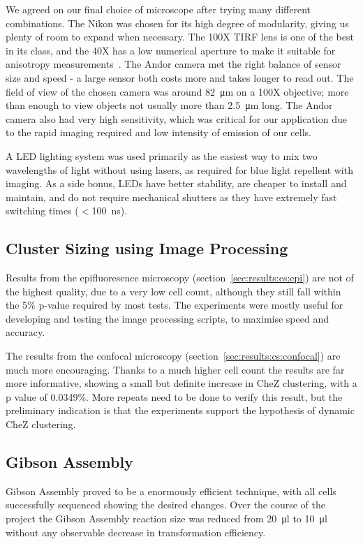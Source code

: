 \documentclass[../main.tex]{subfiles}
\begin{document}
We agreed on our final choice of microscope after trying many different combinations. The Nikon was chosen for its high degree of modularity, giving us plenty of room to expand when necessary. The 100X TIRF lens is one of the best in its class, and the 40X has a low numerical aperture to make it suitable for anisotropy measurements~\citep{lakowicz}. The Andor camera met the right balance of sensor size and speed - a large sensor both costs more and takes longer to read out. The field of view of the chosen camera was around \SI{82}{\micro\meter} on a 100X objective; more than enough to view objects not usually more than \SI{2.5}{\micro\meter} long. The Andor camera also had very high sensitivity, which was critical for our application due to the rapid imaging required and low intensity of emission of our cells.

A LED lighting system was used primarily as the easiest way to mix two wavelengths of light without using lasers, as required for blue light repellent with imaging. As a side bonus, LEDs have better stability, are cheaper to install and maintain, and do not require mechanical shutters as they have extremely fast switching times (\(<\)\SI{100}{\nano\second}). 

\subsection{Cluster Sizing using Image Processing}

Results from the epifluoresence microscopy (section~\ref{sec:results:cs:epi}) are not of the highest quality, due to a very low cell count, although they still fall within the 5\% p-value required by most tests. The experiments were mostly useful for developing and testing the image processing scripts, to maximise speed and accuracy.

The results from the confocal microscopy (section~\ref{sec:results:cs:confocal}) are much more encouraging. Thanks to a much higher cell count the results are far more informative, showing a small but definite increase in CheZ clustering, with a p value of 0.0349\%. More repeats need to be done to verify this result, but the preliminary indication is that the experiments support the hypothesis of dynamic CheZ clustering.

\subsection{Gibson Assembly}
Gibson Assembly proved to be a enormously efficient technique, with all cells successfully sequenced showing the desired changes. Over the course of the project the Gibson Assembly reaction size was reduced from \SI{20}{\micro\litre} to \SI{10}{\micro\litre} without any observable decrease in transformation efficiency. 
\end{document}
